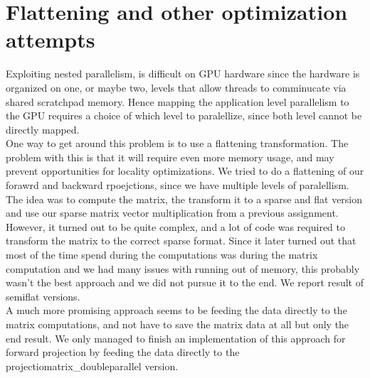 \section{Flattening and other optimization attempts}
Exploiting nested parallelism, is difficult on GPU hardware since the hardware is organized on one, or maybe two, levels that allow threads to comminucate via shared scratchpad memory. Hence mapping the application level parallelism to the GPU requires a choice of which level to paralellize, since both level cannot be directly mapped.\\
One way to get around this problem is to use a flattening transformation. The problem with this is that it will require even more memory usage, and may prevent opportunities for locality optimizations. We tried to do a flattening of our forawrd and backward rpoejctions, since we have multiple levels of paralellism. The idea was to compute the matrix, the transform it to a sparse and flat version and use our sparse matrix vector multiplication from a previous assignment. However, it turned out to be quite complex, and a lot of code was required to transform the matrix to the correct sparse format. Since it later turned out that most of the time spend during the computations was during the matrix computation and we had many issues with running out of memory, this probably wasn't the best approach and we did not pursue it to the end. We report result of semiflat versions.\\
A much more promising approach seems to be feeding the data directly to the matrix computations, and not have to save the matrix data at all but only the end result. We only managed to finish an implementation of this approach for forward projection by feeding the data directly to the projectiomatrix\_doubleparallel version. 

